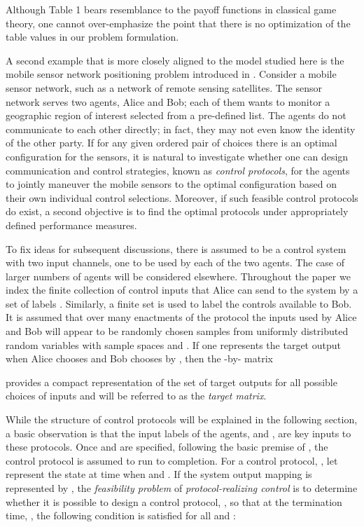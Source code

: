 \documentclass[12pt,onecolumn,draftcls]{IEEEtran}
\begin{document}
Although Table 1 bears resemblance to the payoff functions in classical game theory, one cannot over-emphasize the point that there is no optimization of the table values in our problem formulation.

A second example that is more closely aligned to the model studied here is the mobile sensor network positioning problem introduced in \cite{Wong}.
Consider a mobile sensor network, such as a network of remote sensing satellites.  The sensor
network serves two agents, Alice and Bob; each of them wants to monitor a geographic region
of interest selected from a pre-defined list.   The agents do not communicate to each other directly;
in fact, they may not even know the identity of the other party.   If for any given ordered pair of choices there is an optimal configuration for the sensors, it is natural to investigate whether one can design communication and control strategies, known as {\em control protocols}, for the agents to jointly maneuver the mobile sensors to the optimal configuration based on their own individual control selections.   Moreover, if such feasible control protocols do exist, a second objective is to find the optimal protocols under appropriately defined performance measures.

To fix ideas for subsequent discussions, there is assumed to be a control system with two input channels, one to be used by each of the two agents. 
The case of larger numbers of agents will be considered elsewhere.
Throughout the paper we index the finite collection of control inputs that Alice can send to the system by a set of labels .  Similarly, a finite set  is used to label the controls available to Bob.  It is assumed that  over many enactments of the protocol the inputs used by Alice and Bob will appear to be randomly chosen samples from uniformly distributed random variables with sample spaces  and .   If one represents the target output when Alice chooses  and Bob chooses   by , then the -by- matrix

provides a compact representation of the set of target outputs for all possible choices of inputs and will be referred to as the
{\em target matrix}.

While the structure of control protocols will be explained in the following section, a basic observation is that the input labels of the agents,  and , are key inputs to these protocols.  Once  and  are specified, following the basic premise of \cite{KN}, the control protocol is assumed to run to completion.
For a control
protocol, , let  represent the state at time  when  and .
If the system output mapping is represented by , the {\em feasibility problem} of {\em protocol-realizing control}
is to determine whether it is possible to design a control protocol, , so that at the termination time, ,
the following condition is satisfied for all  and :
\end{document}
